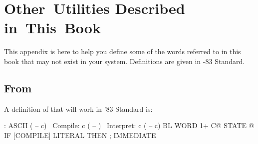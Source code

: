 \chapter{Other~Utilities
Described
in~This~Book}
This appendix is here to help you define some of the words referred to in 
this book that may not exist in your system.  Definitions are given in
\Forth{}-83 Standard.
\section{From }
A definition of  that will work in '83 Standard is:
\begin{Code}
: ASCII  ( -- c)  \  Compile:  c  ( -- )
\ Interpret:   c   ( -- c)
     BL WORD 1+ C@  STATE @
     IF [COMPILE] LITERAL  THEN ; IMMEDIATE
\end{Code}

